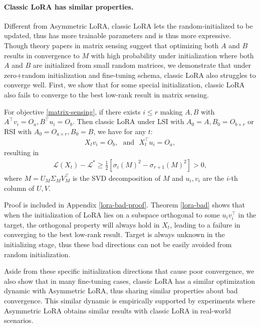\paragraph{Classic LoRA has similar properties.}
\label{lora-approx-assymetric}
Different from Asymmetric LoRA, classic LoRA lets the random-initialized to be updated, thus has more trainable parameters and is thus more expressive. Though theory papers in matrix sensing \cite{tarmoun2021understanding, min2021explicit, ye2021global, wind2023asymmetric} suggest that optimizing both $A$ and $B$ results in convergence to $M$ with high probability under initialization where both $A$ and $B$ are initialized from small random matrices, we demonstrate that under zero+random initialization and fine-tuning schema, classic LoRA also struggles to converge well. First, we show that for some special initialization, classic LoRA also fails to converge to the best low-rank result in matrix sensing. 
\begin{theorem}
    \label{lora-bad}
    For objective \ref{matrix-sensing}, if there exists $i\leq r$ making $A,B$ with $A^\top v_i=O_a,B^\top u_i=O_b$. Then classic LoRA under LSI with $A_0=A,B_0=O_{b\times r}$ or RSI with $A_0=O_{a\times r},B_0=B$, we have for any $t$:
    \begin{align*}
        X_tv_i=O_b,~~~\text{and}~~~X_t^\top u_i=O_a,
    \end{align*}
    resulting in
    \begin{align*}
        \mathcal{L}(X_t)-\mathcal{L}^*\geq \frac{1}{2}[\sigma_i(M)^2-\sigma_{r+1}(M)^2]>0,
    \end{align*}
    where $M=U_M\Sigma_MV_M^\top$ is the SVD decomposition of $M$ and $u_i,v_i$ are the $i$-th column of $U,V$. 
\end{theorem}
Proof is included in Appendix \ref{lora-bad-proof}. Theorem \ref{lora-bad} shows that when the initialization of LoRA lies on a subspace orthogonal to some $u_iv_i^\top$ in the target, the orthogonal property will always hold in $X_t$, leading to a failure in converging to the best low-rank result. Target is always unknown in the initializing stage, thus these bad directions can not be easily avoided from random initialization. 

Aside from these specific initialization directions that cause poor convergence, we also show that in many fine-tuning cases, classic LoRA has a similar optimization dynamic with Asymmetric LoRA, thus sharing similar properties about bad convergence. This similar dynamic is empirically supported by experiments \cite{zhu2024asymmetry} where Asymmetric LoRA obtains similar results with classic LoRA in real-world scenarios. 

